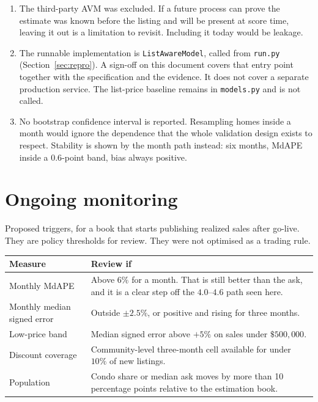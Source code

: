 \documentclass[11pt]{article}
\begin{document}
\begin{enumerate}
\item The third-party AVM was excluded. If a future process can prove the estimate was known before the listing and will be present at score time, leaving it out is a limitation to revisit. Including it today would be leakage.

\item The runnable implementation is \texttt{ListAwareModel}, called from \texttt{run.py} (Section~\ref{sec:repro}). A sign-off on this document covers that entry point together with the specification and the evidence. It does not cover a separate production service. The list-price baseline remains in \texttt{models.py} and is not called.

\item No bootstrap confidence interval is reported. Resampling homes inside a month would ignore the dependence that the whole validation design exists to respect. Stability is shown by the month path instead: six months, MdAPE inside a \(0.6\)-point band, bias always positive.
\end{enumerate}

\section{Ongoing monitoring}
\label{sec:monitor}

Proposed triggers, for a book that starts publishing realized sales after go-live. They are policy thresholds for review. They were not optimised as a trading rule.

\begin{center}
\begin{tabular}{p{5.2cm}p{8.2cm}}
\toprule
Measure & Review if \\
\midrule
Monthly MdAPE & Above \(6\%\) for a month. That is still better than the ask, and it is a clear step off the \(4.0\)--\(4.6\) path seen here. \\
Monthly median signed error & Outside \(\pm 2.5\%\), or positive and rising for three months. \\
Low-price band & Median signed error above \(+5\%\) on sales under \(\$500{,}000\). \\
Discount coverage & Community-level three-month cell available for under \(10\%\) of new listings. \\
Population & Condo share or median ask moves by more than 10 percentage points relative to the estimation book. \\
\bottomrule
\end{tabular}
\end{center}
\end{document}
